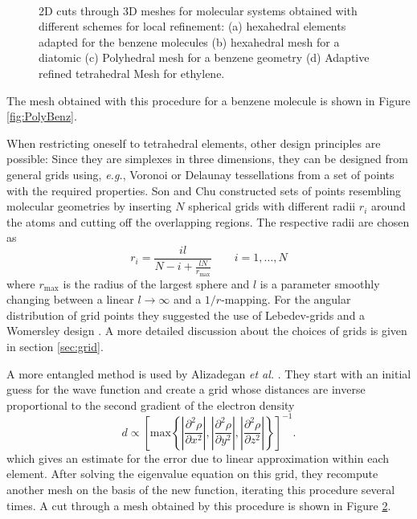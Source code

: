 \begin{figure}
\begin{subfigure}{0.23\textwidth}
   \vspace{-44mm}\caption{$\qquad\quad\qquad\qquad$}
   \label{fig:AdapEthyl}
  \end{subfigure}
  \vspace{34mm}
  \caption{2D cuts through 3D meshes for molecular systems obtained with different schemes for local refinement:
    (a) hexahedral elements adapted for the benzene molecules \cite{fe_dft1}
    (b) hexahedral mesh for a diatomic \cite{fe_hf}
    (c) Polyhedral mesh for a benzene geometry \cite{fe_dft2}
    (d) Adaptive refined tetrahedral Mesh for ethylene. \cite{fe_hf}
    }
\end{figure}
The mesh obtained with this procedure for a benzene molecule \cite{fe_dft1} is shown in Figure \ref{fig:PolyBenz}.

When restricting oneself to tetrahedral elements, other design principles are possible: Since they are simplexes in three dimensions, they can be designed from general grids using, \textit{e.g.}, Voronoi \cite{voronoi} or Delaunay \cite{delaunay} tessellations %
from a set of points with the required properties.
Son and Chu \cite{Son_Chu, Son_Chu0} constructed sets of points resembling molecular geometries by inserting $N$ spherical grids with different radii $r_i$ around the atoms and cutting off the overlapping regions.
The respective radii are chosen as
\begin{equation}
r_i=\frac{il}{N-i+\frac{lN}{r_\text{max}}} \qquad i=1,\hdots ,N 
\end{equation}
where $r_\text{max}$ is the radius of the largest sphere and $l$ is a parameter smoothly changing between a linear $l\rightarrow \infty$ and a $1/r$-mapping.
For the angular distribution of grid points they suggested the use of Lebedev-grids \cite{lebedev} and a Womersley design \cite{Womersley2001,Sloan}.
A more detailed discussion about the choices of grids is given in section \ref{sec:grid}.

A more entangled method is used by Alizadegan \textit{et al.} \cite{fe_hf}. 
They start with an initial guess for the wave function and create a grid whose distances are inverse proportional to the second gradient of the electron density
\begin{equation}
d \propto \left[ \text{max}\left\{\left|\frac{\partial^2 \rho}{\partial x^2}\right| ,
                           \left|\frac{\partial^2 \rho}{\partial y^2}\right| ,
                           \left|\frac{\partial^2 \rho}{\partial z^2}\right| \right\} \right]^{-1}.
\end{equation}
which gives an estimate for the error due to linear approximation within each element.
After solving the eigenvalue equation on this grid, they recompute another mesh on the basis of the new function, iterating this procedure several times.
A cut through a mesh obtained by this procedure is shown in Figure \ref{fig:AdapEthyl}.

